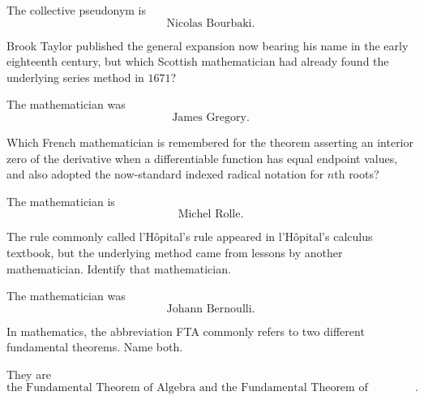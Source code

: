     \begin{solution}
        The collective pseudonym is
        \[
            \boxed{\text{Nicolas Bourbaki}}.
        \]
    \end{solution}

    \begin{expectedproblem}
        Brook Taylor published the general expansion now bearing his name in
        the early eighteenth century, but which Scottish mathematician had
        already found the underlying series method in $1671$?
    \end{expectedproblem}

    \begin{solution}
        The mathematician was
        \[
            \boxed{\text{James Gregory}}.
        \]
    \end{solution}

    \begin{expectedproblem}
        Which French mathematician is remembered for the theorem asserting an
        interior zero of the derivative when a differentiable function has
        equal endpoint values, and also adopted the now-standard indexed
        radical notation for $n$th roots?
    \end{expectedproblem}

    \begin{solution}
        The mathematician is
        \[
            \boxed{\text{Michel Rolle}}.
        \]
    \end{solution}

    \begin{expectedproblem}
        The rule commonly called l'H\^opital's rule appeared in
        l'H\^opital's calculus textbook, but the underlying method came from
        lessons by another mathematician. Identify that mathematician.
    \end{expectedproblem}

    \begin{solution}
        The mathematician was
        \[
            \boxed{\text{Johann Bernoulli}}.
        \]
    \end{solution}

    \begin{expectedproblem}
        In mathematics, the abbreviation FTA commonly refers to two different
        fundamental theorems. Name both.
    \end{expectedproblem}

    \begin{solution}
        They are
        \[
            \boxed{
                \text{the Fundamental Theorem of Algebra and the Fundamental
                Theorem of Arithmetic}
            }.
        \]
    \end{solution}

